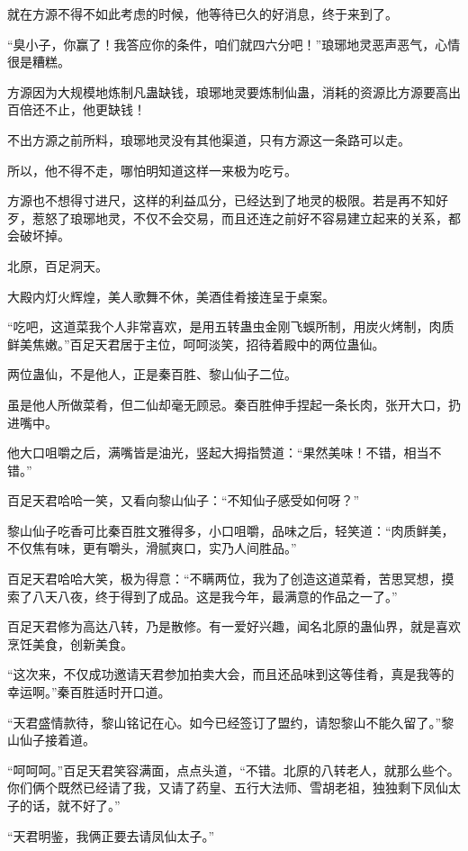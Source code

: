 \begin{this_body}
就在方源不得不如此考虑的时候，他等待已久的好消息，终于来到了。

“臭小子，你赢了！我答应你的条件，咱们就四六分吧！”琅琊地灵恶声恶气，心情很是糟糕。

方源因为大规模地炼制凡蛊缺钱，琅琊地灵要炼制仙蛊，消耗的资源比方源要高出百倍还不止，他更缺钱！

不出方源之前所料，琅琊地灵没有其他渠道，只有方源这一条路可以走。

所以，他不得不走，哪怕明知道这样一来极为吃亏。

方源也不想得寸进尺，这样的利益瓜分，已经达到了地灵的极限。若是再不知好歹，惹怒了琅琊地灵，不仅不会交易，而且还连之前好不容易建立起来的关系，都会破坏掉。

北原，百足洞天。

大殿内灯火辉煌，美人歌舞不休，美酒佳肴接连呈于桌案。

“吃吧，这道菜我个人非常喜欢，是用五转蛊虫金刚飞蜈所制，用炭火烤制，肉质鲜美焦嫩。”百足天君居于主位，呵呵淡笑，招待着殿中的两位蛊仙。

两位蛊仙，不是他人，正是秦百胜、黎山仙子二位。

虽是他人所做菜肴，但二仙却毫无顾忌。秦百胜伸手捏起一条长肉，张开大口，扔进嘴中。

他大口咀嚼之后，满嘴皆是油光，竖起大拇指赞道：“果然美味！不错，相当不错。”

百足天君哈哈一笑，又看向黎山仙子：“不知仙子感受如何呀？”

黎山仙子吃香可比秦百胜文雅得多，小口咀嚼，品味之后，轻笑道：“肉质鲜美，不仅焦有味，更有嚼头，滑腻爽口，实乃人间胜品。”

百足天君哈哈大笑，极为得意：“不瞒两位，我为了创造这道菜肴，苦思冥想，摸索了八天八夜，终于得到了成品。这是我今年，最满意的作品之一了。”

百足天君修为高达八转，乃是散修。有一爱好兴趣，闻名北原的蛊仙界，就是喜欢烹饪美食，创新美食。

“这次来，不仅成功邀请天君参加拍卖大会，而且还品味到这等佳肴，真是我等的幸运啊。”秦百胜适时开口道。

“天君盛情款待，黎山铭记在心。如今已经签订了盟约，请恕黎山不能久留了。”黎山仙子接着道。

“呵呵呵。”百足天君笑容满面，点点头道，“不错。北原的八转老人，就那么些个。你们俩个既然已经请了我，又请了药皇、五行大法师、雪胡老祖，独独剩下凤仙太子的话，就不好了。”

“天君明鉴，我俩正要去请凤仙太子。”


\end{this_body}
